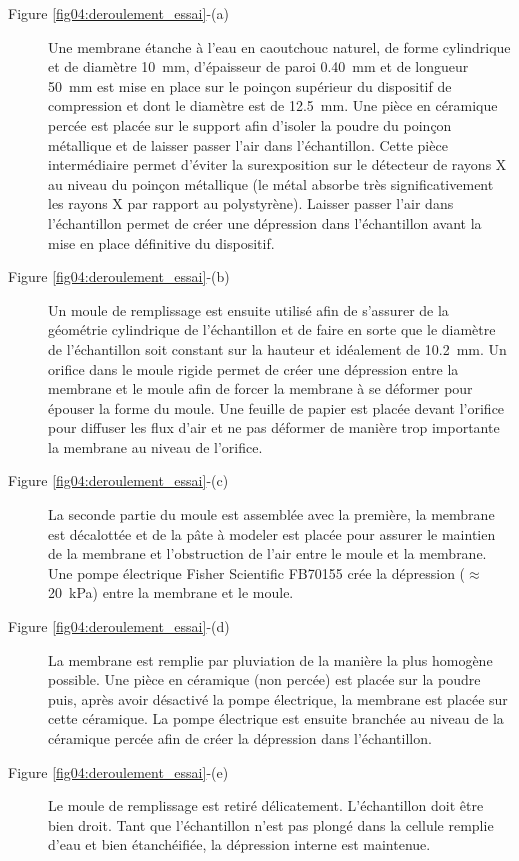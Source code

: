 		\begin{description}
			\item[Figure \ref{fig04:deroulement_essai}-(a)] Une membrane étanche à l'eau en caoutchouc naturel, de forme cylindrique et de diamètre \SI{10}{\milli\meter}, d'épaisseur de paroi \SI{0.40}{\milli\meter} et de longueur \SI{50}{\milli\meter} est mise en place sur le poinçon supérieur du dispositif de compression et dont le diamètre est de \SI{12.5}{\milli\meter}. Une pièce en céramique percée est placée sur le support afin d'isoler la poudre du poinçon métallique et de laisser passer l'air dans l'échantillon. Cette pièce intermédiaire permet d'éviter la surexposition sur le détecteur de rayons X au niveau du poinçon métallique (le métal absorbe très significativement les rayons X par rapport au polystyrène). Laisser passer l'air dans l'échantillon permet de créer une dépression dans l'échantillon avant la mise en place définitive du dispositif.
			\item[Figure \ref{fig04:deroulement_essai}-(b)] Un moule de remplissage est ensuite utilisé afin de s'assurer de la géométrie cylindrique de l'échantillon et de faire en sorte que le diamètre de l'échantillon soit constant sur la hauteur et idéalement de \SI{10.2}{\milli\meter}. Un orifice dans le moule rigide permet de créer une dépression entre la membrane et le moule afin de forcer la membrane à se déformer pour épouser la forme du moule. Une feuille de papier est placée devant l'orifice pour diffuser les flux d'air et ne pas déformer de manière trop importante la membrane au niveau de l'orifice.
			\item[Figure \ref{fig04:deroulement_essai}-(c)] La seconde partie du moule est assemblée avec la première, la membrane est décalottée et de la pâte à modeler est placée pour assurer le maintien de la membrane et l'obstruction de l'air entre le moule et la membrane. Une pompe électrique Fisher Scientific FB70155 crée la dépression ($\approx$ \SI{20}{\kilo\pascal}) entre la membrane et le moule.
			\item[Figure \ref{fig04:deroulement_essai}-(d)] La membrane est remplie par pluviation de la manière la plus homogène possible. Une pièce en céramique (non percée) est placée sur la poudre puis, après avoir désactivé la pompe électrique, la membrane est placée sur cette céramique. La pompe électrique est ensuite branchée au niveau de la céramique percée afin de créer la dépression dans l'échantillon.
			\item[Figure \ref{fig04:deroulement_essai}-(e)] Le moule de remplissage est retiré délicatement. L'échantillon doit être bien droit. Tant que l'échantillon n'est pas plongé dans la cellule remplie d'eau et bien étanchéifiée, la dépression interne est maintenue.

\end{description}
